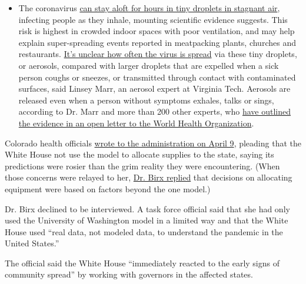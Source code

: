 \begin{itemize}
  \begin{itemize}
  \tightlist
  \item
    The coronavirus
    \href{https://www.nytimes3xbfgragh.onion/2020/07/04/health/239-experts-with-one-big-claim-the-coronavirus-is-airborne.html?action=click\&pgtype=Article\&state=default\&region=MAIN_CONTENT_3\&context=storylines_faq}{can
    stay aloft for hours in tiny droplets in stagnant air}, infecting
    people as they inhale, mounting scientific evidence suggests. This
    risk is highest in crowded indoor spaces with poor ventilation, and
    may help explain super-spreading events reported in meatpacking
    plants, churches and restaurants.
    \href{https://www.nytimes3xbfgragh.onion/2020/07/06/health/coronavirus-airborne-aerosols.html?action=click\&pgtype=Article\&state=default\&region=MAIN_CONTENT_3\&context=storylines_faq}{It's
    unclear how often the virus is spread} via these tiny droplets, or
    aerosols, compared with larger droplets that are expelled when a
    sick person coughs or sneezes, or transmitted through contact with
    contaminated surfaces, said Linsey Marr, an aerosol expert at
    Virginia Tech. Aerosols are released even when a person without
    symptoms exhales, talks or sings, according to Dr. Marr and more
    than 200 other experts, who
    \href{https://academic.oup.com/cid/article/doi/10.1093/cid/ciaa939/5867798}{have
    outlined the evidence in an open letter to the World Health
    Organization}.
  \end{itemize}
\end{itemize}

Colorado health officials
\href{https://documentingcovid19.io/uploads/DHS\%20HHS\%20ventilator\%20usage\%20by\%20state\%20April\%2012.pdf}{wrote
to the administration on April 9}, pleading that the White House not use
the model to allocate supplies to the state, saying its predictions were
rosier than the grim reality they were encountering. (When those
concerns were relayed to her,
\href{https://www.documentcloud.org/documents/6994649-2020-04-13-Colorado-Re-Birx-IHME-Colorado-FOIA.html}{Dr.
Birx replied} that decisions on allocating equipment were based on
factors beyond the one model.)

Dr. Birx declined to be interviewed. A task force official said that she
had only used the University of Washington model in a limited way and
that the White House used ``real data, not modeled data, to understand
the pandemic in the United States.''

The official said the White House ``immediately reacted to the early
signs of community spread'' by working with governors in the affected
states.


